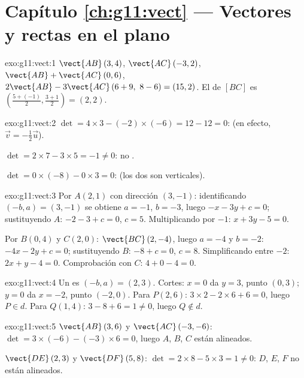 \section*{Capítulo \ref{ch:g11:vect} --- Vectores y rectas en el plano}

\begin{solution}{exo:g11:vect:1}
$\vect{AB}\,(3, 4)$, $\vect{AC}\,(-3, 2)$,
$\vect{AB} + \vect{AC}\,(0, 6)$,
$2\vect{AB} - 3\vect{AC}\,(6 + 9,\ 8 - 6) = (15, 2)$. El  de
$[BC]$ es $\left(\frac{5 + (-1)}{2}, \frac{3+1}{2}\right) = (2, 2)$.
\end{solution}

\begin{solution}{exo:g11:vect:2}
$\det = 4 \times 3 - (-2) \times (-6) = 12 - 12 = 0$:  (en
efecto, $\vec v = -\frac12 \vec u$).

$\det = 2 \times 7 - 3 \times 5 = -1 \neq 0$: no .

$\det = 0 \times (-8) - 0 \times 3 = 0$:  (los dos son
verticales).
\end{solution}

\begin{solution}{exo:g11:vect:3}
Por $A(2,1)$ con dirección $(3, -1)$: identificando $(-b, a) = (3, -1)$ se
obtiene $a = -1$, $b = -3$, luego $-x - 3y + c = 0$; sustituyendo $A$:
$-2 - 3 + c = 0$, $c = 5$. Multiplicando por $-1$: $x + 3y - 5 = 0$.

Por $B(0,4)$ y $C(2,0)$: $\vect{BC}\,(2, -4)$, luego $a = -4$ y $b = -2$:
$-4x - 2y + c = 0$; sustituyendo $B$: $-8 + c = 0$, $c = 8$.
Simplificando entre $-2$: $2x + y - 4 = 0$. Comprobación con $C$:
$4 + 0 - 4 = 0$.
\end{solution}

\begin{solution}{exo:g11:vect:4}
Un  es $(-b, a) = (2, 3)$. Cortes: $x = 0$ da $y = 3$,
punto $(0, 3)$; $y = 0$ da $x = -2$, punto $(-2, 0)$. Para $P(2,6)$:
$3 \times 2 - 2 \times 6 + 6 = 0$, luego $P \in d$. Para $Q(1,4)$:
$3 - 8 + 6 = 1 \neq 0$, luego $Q \notin d$.
\end{solution}

\begin{solution}{exo:g11:vect:5}
$\vect{AB}\,(3, 6)$ y $\vect{AC}\,(-3, -6)$:
$\det = 3 \times (-6) - (-3) \times 6 = 0$, luego $A$, $B$, $C$ están
alineados.

$\vect{DE}\,(2, 3)$ y $\vect{DF}\,(5, 8)$:
$\det = 2 \times 8 - 5 \times 3 = 1 \neq 0$: $D$, $E$, $F$ no están
alineados.
\end{solution}

